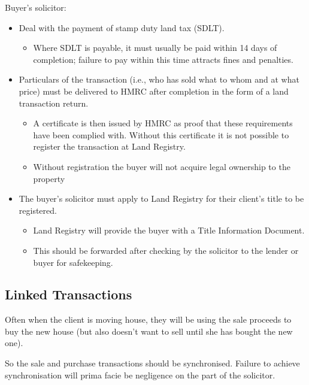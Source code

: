 \documentclass[
]{article}
\providecommand{\tightlist}{%
  \setlength{\itemsep}{0pt}\setlength{\parskip}{0pt}}
\begin{document}
Buyer's solicitor:

\begin{itemize}
\tightlist
\item
  Deal with the payment of stamp duty land tax (SDLT).

  \begin{itemize}
  \tightlist
  \item
    Where SDLT is payable, it must usually be paid within 14 days of
    completion; failure to pay within this time attracts fines and
    penalties.
  \end{itemize}
\item
  Particulars of the transaction (i.e., who has sold what to whom and at
  what price) must be delivered to HMRC after completion in the form of
  a land transaction return.

  \begin{itemize}
  \tightlist
  \item
    A certificate is then issued by HMRC as proof that these
    requirements have been complied with. Without this certificate it is
    not possible to register the transaction at Land Registry.
  \item
    Without registration the buyer will not acquire legal ownership to
    the property
  \end{itemize}
\item
  The buyer's solicitor must apply to Land Registry for their client's
  title to be registered.

  \begin{itemize}
  \tightlist
  \item
    Land Registry will provide the buyer with a Title Information
    Document.
  \item
    This should be forwarded after checking by the solicitor to the
    lender or buyer for safekeeping.
  \end{itemize}
\end{itemize}

\hypertarget{linked-transactions}{%
\subsection{Linked Transactions}\label{linked-transactions}}

Often when the client is moving house, they will be using the sale
proceeds to buy the new house (but also doesn't want to sell until she
has bought the new one).

So the sale and purchase transactions should be synchronised. Failure to
achieve synchronisation will prima facie be negligence on the part of
the solicitor.
\end{document}
